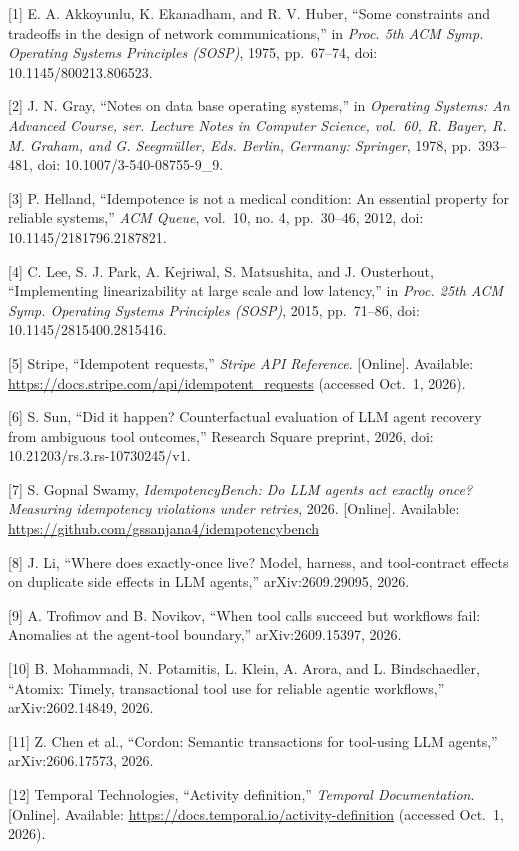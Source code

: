 \documentclass[
  10pt,
]{article}
\begin{document}
{[}1{]} E. A. Akkoyunlu, K. Ekanadham, and R. V. Huber, ``Some
constraints and tradeoffs in the design of network communications,'' in
\emph{Proc. 5th ACM Symp. Operating Systems Principles (SOSP)}, 1975,
pp.~67--74, doi: 10.1145/800213.806523.

{[}2{]} J. N. Gray, ``Notes on data base operating systems,'' in
\emph{Operating Systems: An Advanced Course, ser. Lecture Notes in
Computer Science, vol.~60, R. Bayer, R. M. Graham, and G. Seegmüller,
Eds. Berlin, Germany: Springer}, 1978, pp.~393--481, doi:
10.1007/3-540-08755-9\_9.

{[}3{]} P. Helland, ``Idempotence is not a medical condition: An
essential property for reliable systems,'' \emph{ACM Queue}, vol.~10,
no. 4, pp.~30--46, 2012, doi: 10.1145/2181796.2187821.

{[}4{]} C. Lee, S. J. Park, A. Kejriwal, S. Matsushita, and J.
Ousterhout, ``Implementing linearizability at large scale and low
latency,'' in \emph{Proc. 25th ACM Symp. Operating Systems Principles
(SOSP)}, 2015, pp.~71--86, doi: 10.1145/2815400.2815416.

{[}5{]} Stripe, ``Idempotent requests,'' \emph{Stripe API Reference}.
{[}Online{]}. Available: \url{https://docs.stripe.com/api/idempotent\_requests} (accessed Oct.~1,
2026).

{[}6{]} S. Sun, ``Did it happen? Counterfactual evaluation of LLM agent
recovery from ambiguous tool outcomes,'' Research Square preprint, 2026,
doi: 10.21203/rs.3.rs-10730245/v1.

{[}7{]} S. Gopnal Swamy, \emph{IdempotencyBench: Do LLM agents act
exactly once? Measuring idempotency violations under retries}, 2026.
{[}Online{]}. Available: \url{https://github.com/gssanjana4/idempotencybench}

{[}8{]} J. Li, ``Where does exactly-once live? Model, harness, and
tool-contract effects on duplicate side effects in LLM agents,''
arXiv:2609.29095, 2026.

{[}9{]} A. Trofimov and B. Novikov, ``When tool calls succeed but
workflows fail: Anomalies at the agent-tool boundary,''
arXiv:2609.15397, 2026.

{[}10{]} B. Mohammadi, N. Potamitis, L. Klein, A. Arora, and L.
Bindschaedler, ``Atomix: Timely, transactional tool use for reliable
agentic workflows,'' arXiv:2602.14849, 2026.

{[}11{]} Z. Chen et al., ``Cordon: Semantic transactions for tool-using
LLM agents,'' arXiv:2606.17573, 2026.

{[}12{]} Temporal Technologies, ``Activity definition,'' \emph{Temporal
Documentation}. {[}Online{]}. Available: \url{https://docs.temporal.io/activity-definition} (accessed Oct.~1, 2026).
\end{document}
